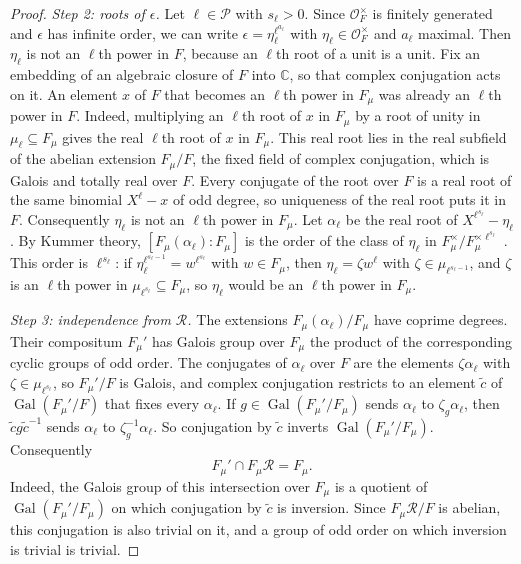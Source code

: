 \documentclass[11pt]{article}
\theoremstyle{plain}
\theoremstyle{definition}
\theoremstyle{remark}
\DeclareMathOperator{\Gal}{Gal}
\newcommand{\OO}{\mathcal O}
\begin{document}
\begin{proof}
\emph{Step 2: roots of $\epsilon$.}  Let $\ell\in\mathcal P$ with
$s_\ell>0$.  Since $\OO_F^\times$ is finitely generated and $\epsilon$ has
infinite order, we can write $\epsilon=\eta_\ell^{\ell^{a_\ell}}$ with
$\eta_\ell\in\OO_F^\times$ and $a_\ell$ maximal.  Then $\eta_\ell$ is not
an $\ell$th power in $F$, because an $\ell$th root of a unit is a unit.
Fix an embedding of an algebraic closure of $F$ into $\mathbb C$, so
that complex conjugation acts on it.  An element $x$ of $F$ that becomes
an $\ell$th power in $F_\mu$ was already an $\ell$th power in $F$.
Indeed, multiplying an $\ell$th root of $x$ in $F_\mu$ by a root of unity
in $\mu_\ell\subseteq F_\mu$ gives the real $\ell$th root of $x$ in
$F_\mu$.  This real root lies in the real subfield of the abelian
extension $F_\mu/F$, the fixed field of complex conjugation, which is
Galois and totally real over $F$.  Every conjugate of the root over $F$ is
a real root of the same binomial $X^\ell-x$ of odd degree, so uniqueness
of the real root puts it in $F$.  Consequently $\eta_\ell$ is not an
$\ell$th power in $F_\mu$.  Let $\alpha_\ell$ be the real root of
$X^{\ell^{s_\ell}}-\eta_\ell$.  By Kummer theory, $[F_\mu(\alpha_\ell):F_\mu]$
is the order of the class of $\eta_\ell$ in
$F_\mu^\times/F_\mu^{\times\ell^{s_\ell}}$ \cite[Chapter~VII,
Appendix~A, Theorem~A.3]{MilneCFT}.  This order is $\ell^{s_\ell}$: if
$\eta_\ell^{\ell^{s_\ell-1}}=w^{\ell^{s_\ell}}$ with $w\in F_\mu$, then
$\eta_\ell=\zeta w^\ell$ with $\zeta\in\mu_{\ell^{s_\ell-1}}$, and $\zeta$
is an $\ell$th power in $\mu_{\ell^{s_\ell}}\subseteq F_\mu$, so
$\eta_\ell$ would be an $\ell$th power in $F_\mu$.

\emph{Step 3: independence from $\mathcal R$.}  The extensions
$F_\mu(\alpha_\ell)/F_\mu$ have coprime degrees.  Their compositum
$F_\mu'$ has Galois group over $F_\mu$ the product of the corresponding
cyclic groups of odd order.  The conjugates of $\alpha_\ell$ over $F$ are
the elements $\zeta\alpha_\ell$ with $\zeta\in\mu_{\ell^{s_\ell}}$, so
$F_\mu'/F$ is Galois, and complex conjugation restricts to an element
$\tilde c$ of $\Gal(F_\mu'/F)$ that fixes every $\alpha_\ell$.  If $g\in
\Gal(F_\mu'/F_\mu)$ sends $\alpha_\ell$ to $\zeta_g\alpha_\ell$, then
$\tilde cg\tilde c^{-1}$ sends $\alpha_\ell$ to
$\zeta_g^{-1}\alpha_\ell$.  So conjugation by $\tilde c$ inverts
$\Gal(F_\mu'/F_\mu)$.  Consequently
\[
 F_\mu'\cap F_\mu\mathcal R=F_\mu.
\]
Indeed, the Galois group of this intersection over $F_\mu$ is a quotient
of $\Gal(F_\mu'/F_\mu)$ on which conjugation by $\tilde c$ is inversion.
Since $F_\mu\mathcal R/F$ is abelian, this conjugation is also trivial on
it, and a group of odd order on which inversion is trivial is trivial.


\end{proof}
\end{document}
